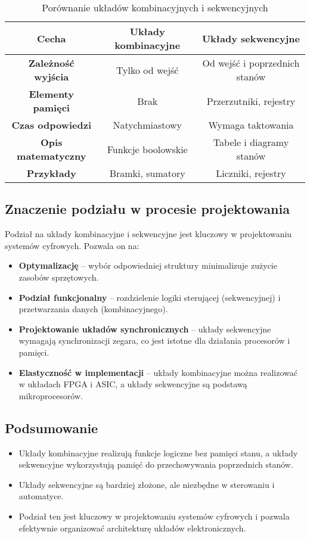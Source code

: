 \begin{table}[h]
    \centering
    \renewcommand{\arraystretch}{1.3}
    \begin{tabular}{|c|c|c|}
        \hline
        \textbf{Cecha} & \textbf{Układy kombinacyjne} & \textbf{Układy sekwencyjne} \\
        \hline
        \textbf{Zależność wyjścia} & Tylko od wejść & Od wejść i poprzednich stanów \\
        \hline
        \textbf{Elementy pamięci} & Brak & Przerzutniki, rejestry \\
        \hline
        \textbf{Czas odpowiedzi} & Natychmiastowy & Wymaga taktowania \\
        \hline
        \textbf{Opis matematyczny} & Funkcje boolowskie & Tabele i diagramy stanów \\
        \hline
        \textbf{Przykłady} & Bramki, sumatory & Liczniki, rejestry \\
        \hline
    \end{tabular}
    \caption{Porównanie układów kombinacyjnych i sekwencyjnych}
\end{table}


\subsection{Znaczenie podziału w procesie projektowania}
Podział na układy kombinacyjne i sekwencyjne jest kluczowy w projektowaniu systemów cyfrowych. Pozwala on na:
\begin{itemize}
    \item \textbf{Optymalizację} – wybór odpowiedniej struktury minimalizuje zużycie zasobów sprzętowych.
    \item \textbf{Podział funkcjonalny} – rozdzielenie logiki sterującej (sekwencyjnej) i przetwarzania danych (kombinacyjnego).
    \item \textbf{Projektowanie układów synchronicznych} – układy sekwencyjne wymagają synchronizacji zegara, co jest istotne dla działania procesorów i pamięci.
    \item \textbf{Elastyczność w implementacji} – układy kombinacyjne można realizować w układach FPGA i ASIC, a układy sekwencyjne są podstawą mikroprocesorów.
\end{itemize}

\subsection{Podsumowanie}
\begin{itemize}
    \item Układy kombinacyjne realizują funkcje logiczne bez pamięci stanu, a układy sekwencyjne wykorzystują pamięć do przechowywania poprzednich stanów.
    \item Układy sekwencyjne są bardziej złożone, ale niezbędne w sterowaniu i automatyce.
    \item Podział ten jest kluczowy w projektowaniu systemów cyfrowych i pozwala efektywnie organizować architekturę układów elektronicznych.
\end{itemize}